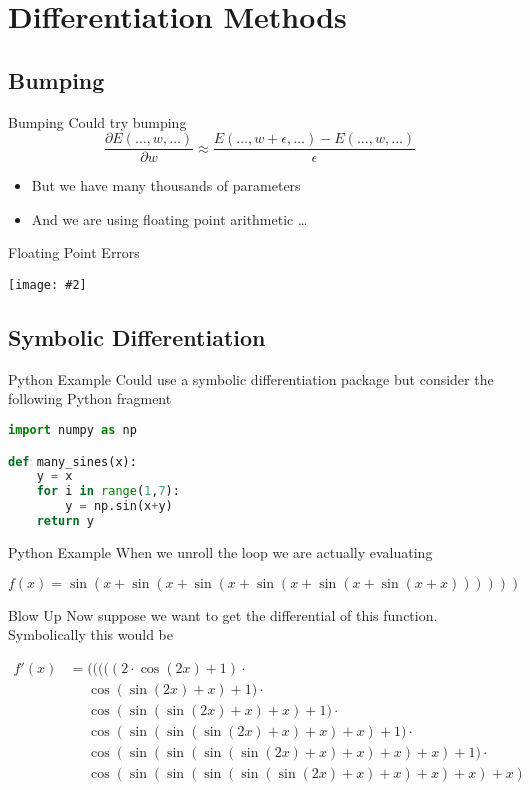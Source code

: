 \documentclass{beamer}
\newcommand {\framedgraphic}[2] {
    \begin{frame}{#1}
        \begin{center}
            \texttt{[image: \#2]}
        \end{center}
    \end{frame}
}
\begin{document}
\section{Differentiation Methods}

\subsection{Bumping}

\begin{frame}{Bumping}
Could try bumping
$$
\frac{\partial E(\ldots, w, \ldots)}{\partial w} \approx \frac{E(\ldots, w + \epsilon, \ldots) - E(\ldots, w, \ldots)}{\epsilon}
$$
\begin{itemize}
\item
But we have many thousands of parameters
\item
And we are using floating point arithmetic \ldots
\end{itemize}
\end{frame}

\framedgraphic{Floating Point Errors}{diagrams/13a2bd186a0e123f040da9491fa98684.png}

\subsection{Symbolic Differentiation}

\begin{frame}[fragile]{Python Example}
  Could use a symbolic differentiation package but consider the
  following Python fragment
\begin{lstlisting}[language=Python]
import numpy as np

def many_sines(x):
    y = x
    for i in range(1,7):
        y = np.sin(x+y)
    return y
\end{lstlisting}
\end{frame}

\begin{frame}[fragile]{Python Example}
When we unroll the loop we are actually evaluating

$$
f(x) = \sin(x + \sin(x + \sin(x + \sin(x + \sin(x + \sin(x + x))))))
$$

\end{frame}

\begin{frame}[fragile]{Blow Up}
Now suppose we want to get the differential of this
function. Symbolically this would be

$$
\begin{aligned}
f'(x) &=           (((((2\cdot \cos(2x)+1)\cdot \\
      &\phantom{=} \cos(\sin(2x)+x)+1)\cdot \\
      &\phantom{=} \cos(\sin(\sin(2x)+x)+x)+1)\cdot \\
      &\phantom{=} \cos(\sin(\sin(\sin(2x)+x)+x)+x)+1)\cdot \\
      &\phantom{=} \cos(\sin(\sin(\sin(\sin(2x)+x)+x)+x)+x)+1)\cdot \\
      &\phantom{=} \cos(\sin(\sin(\sin(\sin(\sin(2x)+x)+x)+x)+x)+x)
\end{aligned}
$$
\end{frame}
\end{document}
